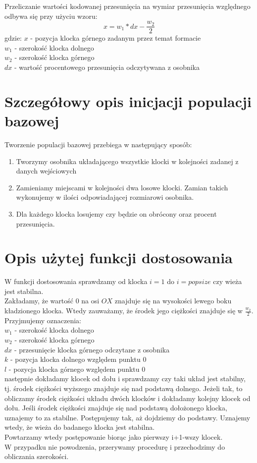 \documentclass[12pt,a4paper]{article}
\begin{document}
Przeliczanie wartości kodowanej przesunięcia na wymiar przesunięcia względnego odbywa się przy użyciu wzoru:
$$x=w_1*dx-\frac{w_2}{2}$$
gdzie: $x$ - pozycja klocka górnego zadanym przez temat formacie\\
$w_1$ - szerokość klocka dolnego\\
$w_2$ - szerokość klocka górnego\\
$dx$ - wartość procentowego przesunięcia odczytywana z osobnika
\section{Szczegółowy opis inicjacji populacji bazowej}
Tworzenie populacji bazowej przebiega w następujący sposób:
\begin{enumerate}
\item Tworzymy osobnika układającego wszystkie klocki w kolejności zadanej z danych wejściowych
\item Zamieniamy miejscami w kolejności dwa losowe klocki. Zamian takich wykonujemy w ilości odpowiadającej rozmiarowi osobnika.
\item Dla każdego klocka losujemy czy będzie on obrócony oraz procent przesunięcia.
\end{enumerate}
\section{Opis użytej funkcji dostosowania}
W funkcji dostosowania sprawdzamy od klocka $i=1$ do $i=popsize$ czy wieża jest stabilna.\\
Zakładamy, że wartość $0$ na osi $OX$ znajduje się na wysokości lewego boku kładzionego klocka. Wtedy zauważamy, że środek jego ciężkości znajduje się w $\frac{w_2}{2}$.\\
Przyjmujemy oznaczenia:\\
$w_1$ - szerokość klocka dolnego\\
$w_2$ - szerokość klocka górnego\\
$dx$ - przesunięcie klocka górnego odczytane z osobnika\\
$k$ - pozycja klocka dolnego względem punktu $0$\\
$l$ - pozycja klocka górnego względem punktu $0$\\
następnie dokładamy klocek od dołu i sprawdzamy czy taki układ jest stabilny, tj. środek ciężkości wyższego znajduje się nad podstawą dolnego.
Jeżeli tak, to obliczamy środek ciężkości układu dwóch klocków i dokładamy kolejny klocek od dołu.
Jeśli środek ciężkości znajduje się nad podstawą dołożonego klocka, uznajemy to za stabilne.
Postępujemy tak, aż dojdziemy do podstawy. Uznajemy wtedy, że wieża do badanego klocka jest stabilna.\\
Powtarzamy wtedy postępowanie biorąc jako pierwszy i+1-wszy klocek.\\
W przypadku nie powodzenia, przerywamy procedurę i przechodzimy do obliczania szerokości.
\end{document}
